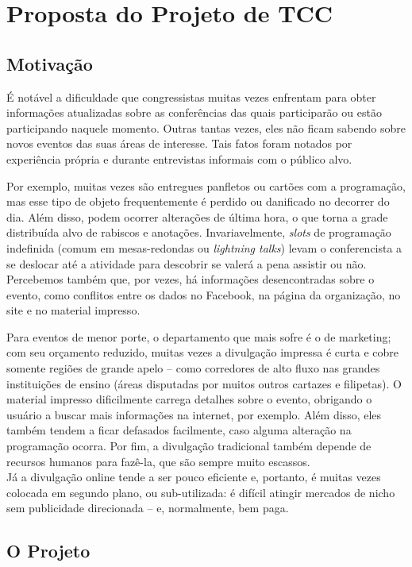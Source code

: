 \documentclass[12pt,a4paper,twoside,hyphens,english,brazil]{abntex2}
\begin{document}
\chapter{Proposta do Projeto de TCC}

\section{Motivação}

É notável a dificuldade que congressistas muitas vezes enfrentam para obter informações atualizadas sobre as conferências das quais participarão ou estão participando naquele momento. Outras tantas vezes, eles não ficam sabendo sobre novos eventos das suas áreas de interesse. Tais fatos foram notados por experiência própria e durante entrevistas informais com o público alvo.

Por exemplo, muitas vezes são entregues panfletos ou cartões com a programação, mas esse tipo de objeto frequentemente é perdido ou danificado no decorrer do dia. Além disso, podem ocorrer alterações de última hora, o que torna a grade distribuída alvo de rabiscos e anotações. Invariavelmente, \emph{slots} de programação indefinida (comum em mesas-redondas ou \emph{lightning talks}\footnotemark) levam o conferencista a se deslocar até a atividade para descobrir se valerá a pena assistir ou não. Percebemos também que, por vezes, há informações desencontradas sobre o evento, como conflitos entre os dados no Facebook, na página da organização, no site e no material impresso.

Para eventos de menor porte, o departamento que mais sofre é o de marketing; com seu orçamento reduzido, muitas vezes a divulgação impressa é curta e cobre somente regiões de grande apelo -- como corredores de alto fluxo nas grandes instituições de ensino (áreas disputadas por muitos outros cartazes e filipetas). O material impresso dificilmente carrega detalhes sobre o evento, obrigando o usuário a buscar mais informações na internet, por exemplo. Além disso, eles também tendem a ficar defasados facilmente, caso alguma alteração na programação ocorra. Por fim, a divulgação tradicional também depende de recursos humanos para fazê-la, que são sempre muito escassos.\\
Já a divulgação online tende a ser pouco eficiente e, portanto, é muitas vezes colocada em segundo plano, ou sub-utilizada: é difícil atingir mercados de nicho sem publicidade direcionada -- e, normalmente, bem paga.

\section{O Projeto}
\end{document}
